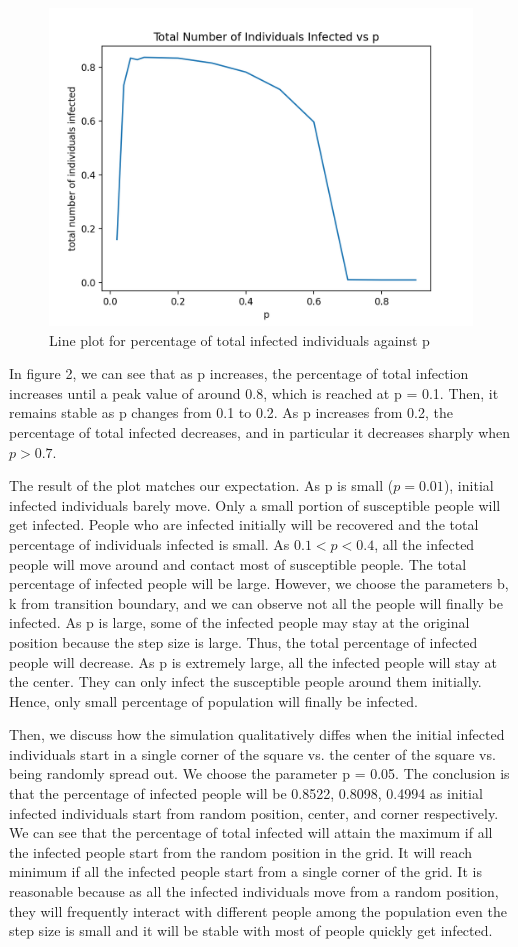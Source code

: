 \documentclass{article}
\begin{document}
\begin{figure}[htp]
\centering
\includegraphics[width=.3\textwidth]{secondspatialplot.png}
\caption{Line plot for percentage of total infected individuals against p}
\label{fig:figure2}

\end{figure}


In figure 2, we can see that as p increases, the percentage of total infection increases until a peak value of around 0.8, which is reached at p = 0.1. Then, it remains stable as p changes from 0.1 to 0.2. As p increases from 0.2, the percentage of total infected decreases, and in particular it decreases sharply when $p > 0.7$. 

The result of the plot matches our expectation. As p is small ($p=0.01$), initial infected individuals barely move. Only a small portion of susceptible people will get infected. People who are infected initially will be recovered and the total percentage of individuals infected is small. As $ 0.1<p<0.4 $, all the infected people will move around and contact most of susceptible people. The total percentage of infected people will be large. However, we choose the parameters b, k from transition boundary, and we can observe not all the people will finally be infected. As p is large, some of the infected people may stay at the original position because the step size is large. Thus, the total percentage of infected people will decrease. As p is extremely large, all the infected people will stay at the center. They can only infect the susceptible people around them initially. Hence, only small percentage of population will finally be infected. 


Then, we discuss how the simulation qualitatively diffes when the initial infected individuals start in a single corner of the square vs. the center of the square vs. being randomly spread out. We choose the parameter p = 0.05. The conclusion is that the percentage of infected people will be 0.8522, 0.8098, 0.4994 as initial infected individuals start from random position, center, and corner respectively. We can see that the percentage of total infected will attain the maximum if all the infected people start from the random position in the grid. It will reach minimum if all the infected people start from a single corner of the grid. It is reasonable because as all the infected individuals move from a random position, they will frequently interact with different people among the population even the step size is small and it will be stable with most of people quickly get infected.
\end{document}

